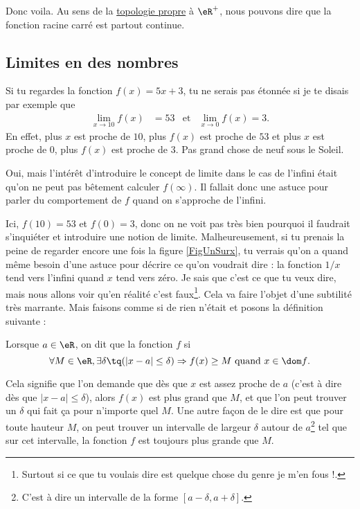 Donc voila. Au sens de la \href{http://fr.wikipedia.org/wiki/Topologie_induite}{topologie propre} à $\eR^+$, nous pouvons dire que la fonction racine carré est partout continue.
\subsection{Limites en des nombres}

Si tu regardes la fonction $f(x)=5x+3$, tu ne serais pas étonnée si je te disais par exemple que 
\begin{align}
\lim_{x\to 10}f(x)&=53&\text{et}&\lim_{x\to 0}f(x)=3.
\end{align}
En effet, plus $x$ est proche de $10$, plus $f(x)$ est proche de $53$ et plus $x$ est proche de $0$, plus $f(x)$ est proche de $3$. Pas grand chose de neuf sous le Soleil.

 Oui, mais l'intérêt d'introduire le concept de limite dans le cas de l'infini était qu'on ne peut pas bêtement calculer $f(\infty)$. Il fallait donc une astuce pour parler du comportement de $f$ quand on s'approche de l'infini.

Ici, $f(10)=53$ et $f(0)=3$, donc on ne voit pas très bien pourquoi il faudrait s'inquiéter et introduire une notion de limite. Malheureusement, si tu prenais la peine de regarder encore une fois la figure \ref{FigUnSurx}, tu verrais qu'on a quand même besoin d'une astuce pour décrire ce qu'on voudrait dire  : la fonction $1/x$ tend vers l'infini quand $x$ tend vers zéro. Je sais que c'est ce que tu veux dire, mais nous allons voir qu'en réalité c'est faux\footnote{Surtout si ce que tu voulais dire est quelque chose du genre \og je m'en fous !\fg.}. Cela va faire l'objet d'une subtilité très marrante. Mais faisons comme si de rien n'était et posons la définition suivante :
\begin{definition}		\label{DefInfNombre}
Lorsque $a\in\eR$, on dit que la fonction $f$  si
\[ 
  \forall M\in\eR,\exists \delta\tq (| x-a |\leq \delta )\Rightarrow f(x)\geq M\text{ quand $x\in\dom f$}.
\]
\end{definition}
Cela signifie que l'on demande que dès que $x$ est assez proche de $a$ (c'est à dire dès que $| x-a |\leq\delta$), alors $f(x)$ est plus grand que $M$, et que l'on peut trouver un $\delta$ qui fait ça pour n'importe quel $M$. Une autre façon de le dire est que pour toute hauteur $M$, on peut trouver un intervalle de largeur $\delta$ autour de $a$\footnote{C'est à dire un intervalle de la forme $[a-\delta,a+\delta]$.} tel que sur cet intervalle, la fonction $f$ est toujours plus grande que $M$.

